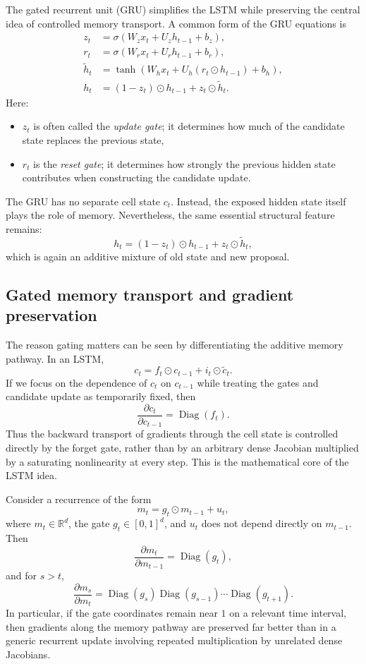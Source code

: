 The gated recurrent unit (GRU) simplifies the LSTM while preserving the central idea of controlled memory transport.
A common form of the GRU equations is
\begin{align*}
 z_t &= \sigma(W_z x_t + U_z h_{t-1} + b_z),\\
 r_t &= \sigma(W_r x_t + U_r h_{t-1} + b_r),\\
 \widetilde{h}_t &= \tanh(W_h x_t + U_h(r_t \odot h_{t-1}) + b_h),\\
 h_t &= (1-z_t) \odot h_{t-1} + z_t \odot \widetilde{h}_t.
\end{align*}
Here:
\begin{itemize}
    \item $z_t$ is often called the \emph{update gate}; it determines how much of the candidate state replaces the previous state,
    \item $r_t$ is the \emph{reset gate}; it determines how strongly the previous hidden state contributes when constructing the candidate update.
\end{itemize}

\medskip

The GRU has no separate cell state $c_t$.
Instead, the exposed hidden state itself plays the role of memory.
Nevertheless, the same essential structural feature remains:
\[
 h_t = (1-z_t) \odot h_{t-1} + z_t \odot \widetilde{h}_t,
\]
which is again an additive mixture of old state and new proposal.

\subsection*{Gated memory transport and gradient preservation}

The reason gating matters can be seen by differentiating the additive memory pathway.
In an LSTM,
\[
 c_t = f_t \odot c_{t-1} + i_t \odot \widetilde{c}_t.
\]
If we focus on the dependence of $c_t$ on $c_{t-1}$ while treating the gates and candidate update as temporarily fixed, then
\[
 \frac{\partial c_t}{\partial c_{t-1}} = \operatorname{Diag}(f_t).
\]
Thus the backward transport of gradients through the cell state is controlled directly by the forget gate, rather than by an arbitrary dense Jacobian multiplied by a saturating nonlinearity at every step.
This is the mathematical core of the LSTM idea.

\begin{proposition}
Consider a recurrence of the form
\[
 m_t = g_t \odot m_{t-1} + u_t,
\]
where $m_t \in \mathbb{R}^d$, the gate $g_t \in [0,1]^d$, and $u_t$ does not depend directly on $m_{t-1}$.
Then
\[
 \frac{\partial m_t}{\partial m_{t-1}} = \operatorname{Diag}(g_t),
\]
and for $s>t$,
\[
 \frac{\partial m_s}{\partial m_t}
= \operatorname{Diag}(g_s)\operatorname{Diag}(g_{s-1})\cdots \operatorname{Diag}(g_{t+1}).
\]
In particular, if the gate coordinates remain near $1$ on a relevant time interval, then gradients along the memory pathway are preserved far better than in a generic recurrent update involving repeated multiplication by unrelated dense Jacobians.
\end{proposition}

